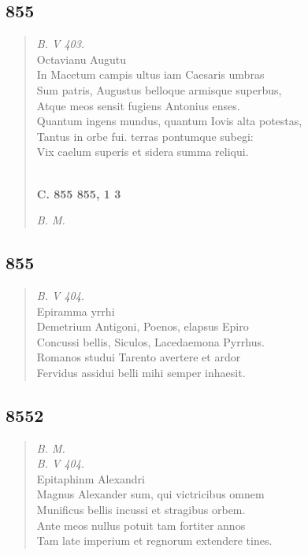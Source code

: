 \documentclass[11pt, a4paper]{report}
\begin{document}
            \subsection*{855}
      \begin{verse}
      \textit{B. V 403.} \\ Octavianu Augutu \\ In Macetum campis ultus iam Caesaris umbras \\ Sum patris, Augustus belloque armisque superbus, \\ Atque meos sensit fugiens Antonius enses. \\ Quantum ingens mundus, quantum Iovis alta potestas, \\ Tantus in orbe fui. terras pontumque subegi: \\ Vix caelum superis et sidera summa reliqui. \\ 
        ﻿\pagebreak 
     \marginpar{[310]} \begin{center} \textbf{C. 855 855, 1 3} \end{center}\textit{B. M.} \\ 
      \end{verse}
  
            \subsection*{855}
      \begin{verse}
      \textit{B. V 404.} \\ Epiramma yrrhi \\ Demetrium Antigoni, Poenos, elapsus Epiro \\ Concussi bellis, Siculos, Lacedaemona Pyrrhus. \\ Romanos studui Tarento avertere et ardor \\ Fervidus assidui belli mihi semper inhaesit. \\ 
      \end{verse}
  
            \subsection*{8552}
      \begin{verse}
      \textit{B. M.} \\ \textit{B. V 404.} \\ Epitaphinm Alexandri \\ Magnus Alexander sum, qui victricibus omnem \\ Munificus bellis incussi et stragibus orbem. \\ Ante meos nullus potuit tam fortiter annos \\ Tam late imperium et regnorum extendere tines. \\ 
      \end{verse}
  
\end{document}
